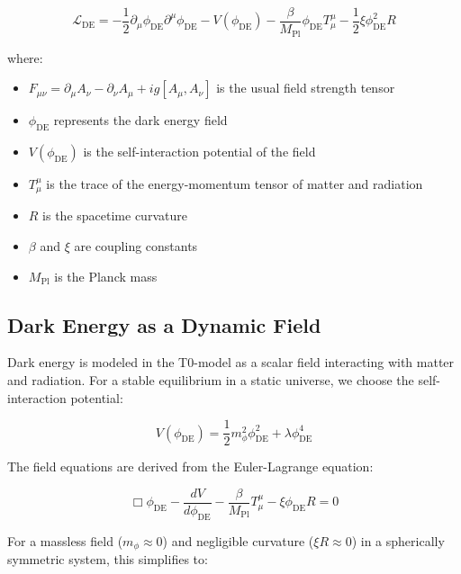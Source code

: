\documentclass[a4paper,12pt]{article}
\theoremstyle{definition}
\theoremstyle{remark}
\begin{document}
	\begin{equation}
		\mathcal{L}_{\text{DE}} = -\frac{1}{2}\partial_\mu \phi_{\text{DE}} \partial^\mu \phi_{\text{DE}} - V(\phi_{\text{DE}}) - \frac{\beta}{M_{\text{Pl}}} \phi_{\text{DE}} T^{\mu}_{\mu} - \frac{1}{2}\xi \phi_{\text{DE}}^2 R
	\end{equation}
	
	where:
	\begin{itemize}
		\item \(F_{\mu\nu} = \partial_\mu A_\nu - \partial_\nu A_\mu + ig[A_\mu, A_\nu]\) is the usual field strength tensor
		\item \(\phi_{\text{DE}}\) represents the dark energy field
		\item \(V(\phi_{\text{DE}})\) is the self-interaction potential of the field
		\item \(T^{\mu}_{\mu}\) is the trace of the energy-momentum tensor of matter and radiation
		\item \(R\) is the spacetime curvature
		\item \(\beta\) and \(\xi\) are coupling constants
		\item \(M_{\text{Pl}}\) is the Planck mass
	\end{itemize}
	
	\subsection{Dark Energy as a Dynamic Field}
	
	Dark energy is modeled in the T0-model as a scalar field interacting with matter and radiation. For a stable equilibrium in a static universe, we choose the self-interaction potential:
	
	\begin{equation}
		V(\phi_{\text{DE}}) = \frac{1}{2}m_{\phi}^2\phi_{\text{DE}}^2 + \lambda \phi_{\text{DE}}^4
	\end{equation}
	
	The field equations are derived from the Euler-Lagrange equation:
	
	\begin{equation}
		\Box\phi_{\text{DE}} - \frac{dV}{d\phi_{\text{DE}}} - \frac{\beta}{M_{\text{Pl}}}T^{\mu}_{\mu} - \xi \phi_{\text{DE}} R = 0
	\end{equation}
	
	For a massless field (\(m_{\phi} \approx 0\)) and negligible curvature (\(\xi R \approx 0\)) in a spherically symmetric system, this simplifies to:
	
\end{document}
